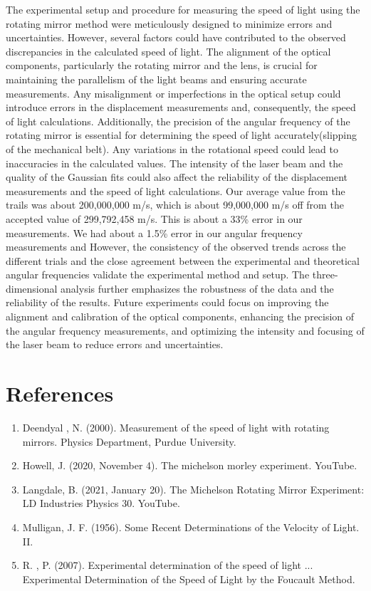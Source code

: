 \documentclass[12pt]{article}
\begin{document}
        The experimental setup and procedure for measuring the speed of light using the rotating mirror method
        were meticulously designed to minimize errors and uncertainties. However, several factors could have
        contributed to the observed discrepancies in the calculated speed of light. The alignment of the optical
        components, particularly the rotating mirror and the lens, is crucial for maintaining the parallelism of
        the light beams and ensuring accurate measurements. Any misalignment or imperfections in the optical
        setup could introduce errors in the displacement measurements and, consequently, the speed of light
        calculations. Additionally, the precision of the angular frequency of the rotating mirror is essential
        for determining the speed of light accurately(slipping of the mechanical belt). Any variations in the rotational speed could lead to
        inaccuracies in the calculated values. The intensity of the laser beam and the quality of the Gaussian
        fits could also affect the reliability of the displacement measurements and the speed of light calculations.
        Our average value from the trails was about 200,000,000 m/s, which is about 99,000,000 m/s off from the accepted value of 299,792,458 m/s.
        This is about a 33\% error in our measurements. We had about a 1.5\% error in our angular frequency measurements and 
        However, the consistency of the observed trends across the different trials and the close agreement between
        the experimental and theoretical angular frequencies validate the experimental method and setup. The three-dimensional
        analysis further emphasizes the robustness of the data and the reliability of the results. Future experiments could
        focus on improving the alignment and calibration of the optical components, enhancing the precision of the angular
        frequency measurements, and optimizing the intensity and focusing of the laser beam to reduce errors and uncertainties.
        



\section{References}
    \begin{enumerate}
        \sloppy
        \item  Deendyal , N. (2000). Measurement of the speed of light with rotating mirrors. Physics Department, Purdue University.
        \item Howell, J. (2020, November 4). The michelson morley experiment. YouTube.
        \item Langdale, B. (2021, January 20). The Michelson Rotating Mirror Experiment: LD Industries Physics 30. YouTube.
        \item Mulligan, J. F. (1956). Some Recent Determinations of the Velocity of Light. II. 
        \item R. , P. (2007). Experimental determination of the speed of light ... Experimental Determination of the Speed of Light by the Foucault Method. 
    \end{enumerate}
\end{document}
